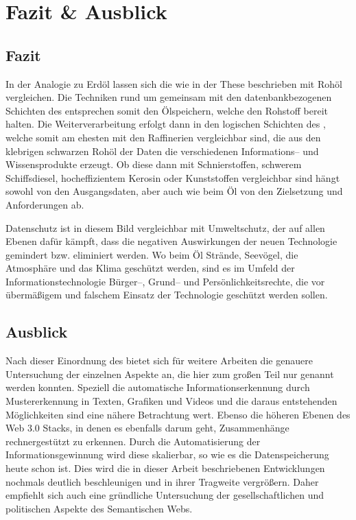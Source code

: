\section{Fazit \& Ausblick}

\subsection{Fazit}

In der Analogie zu Erdöl lassen sich die  wie in der These beschrieben mit Rohöl vergleichen. Die Techniken rund um  gemeinsam mit den datenbankbezogenen Schichten des  entsprechen somit den Ölspeichern, welche den Rohstoff bereit halten. Die Weiterverarbeitung erfolgt dann in den logischen Schichten des , welche somit am ehesten mit den Raffinerien vergleichbar sind, die aus den klebrigen schwarzen Rohöl der Daten die verschiedenen Informations-- und Wissensprodukte erzeugt. Ob diese dann mit Schnierstoffen, schwerem Schiffsdiesel, hocheffizientem Kerosin oder Kunststoffen vergleichbar sind hängt sowohl von den Ausgangsdaten, aber auch wie beim Öl von den Zielsetzung und Anforderungen ab.

Datenschutz ist in diesem Bild vergleichbar mit Umweltschutz, der auf allen Ebenen dafür kämpft, dass die negativen Auswirkungen der neuen Technologie gemindert bzw. eliminiert werden. Wo beim Öl Strände, Seevögel, die Atmosphäre und das Klima geschützt werden, sind es  im Umfeld der Informationstechnologie Bürger--, Grund-- und Persönlichkeitsrechte, die vor übermäßigem und falschem Einsatz der Technologie geschützt werden sollen.

\subsection{Ausblick}

Nach dieser Einordnung des  bietet sich für weitere Arbeiten die genauere Untersuchung der einzelnen Aspekte an, die hier zum großen Teil nur genannt werden konnten. Speziell die automatische Informationserkennung durch Mustererkennung in Texten, Grafiken und Videos und die daraus entstehenden Möglichkeiten sind eine nähere Betrachtung wert. Ebenso die höheren Ebenen des Web 3.0 Stacks, in denen es ebenfalls darum geht, Zusammenhänge rechnergestützt zu erkennen. Durch die Automatisierung der Informationsgewinnung wird diese skalierbar, so wie es die Datenspeicherung heute schon ist. Dies wird die in dieser Arbeit beschriebenen Entwicklungen nochmals deutlich beschleunigen und in ihrer Tragweite vergrößern. Daher empfiehlt sich auch eine gründliche Untersuchung der gesellschaftlichen und politischen Aspekte des Semantischen Webs.